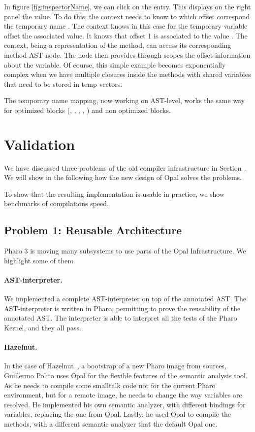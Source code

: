 \documentclass[preprint,10pt]{sigplanconf}
\begin{document}
In figure \ref{fig:inspectorName}, we can click on the \ct{[temp]} entry. This displays on the right panel the value. To do this, the context needs to know to which offset correspond the temporary name . The context knows in this case for the temporary variable offset the associated value. It knows that offset 1 is associated to the value . The context, being a representation of the method, can access its corresponding method AST node. The node then provides through scopes the offset information about the variable. Of course, this simple example becomes exponentially complex when we have multiple closures inside the methods with shared variables that need to be stored in temp vectors.

The temporary name mapping, now working on AST-level, works the same way for optimized blocks (, , , , ) and non optimized blocks.

\section{Validation}
\label{sec:validation}

We have discussed three problems of the old compiler infrastructure in Section~. We will show in the following how the new design of Opal solves
the problems.

To show that the resulting implementation is usable in practice, we show benchmarks of compilations speed.


\subsection{Problem 1: Reusable Architecture}
\label{sec:reusableArchitecture}

Pharo 3 is moving many subsystems to use parts of the Opal Infrastructure. We highlight some of them.

\paragraph{AST-interpreter.} We implemented a complete AST-interpreter on top of the annotated AST. The AST-interpreter is written in Pharo, permitting to prove the reusability of the annotated AST. The interpreter is able to interpret all the tests of the Pharo Kernel, and they all pass.

\paragraph{Hazelnut.} In the case of Hazelnut~\cite{Casa11a}, a bootstrap of a new Pharo image from sources, Guillermo Polito uses Opal for the flexible features of the semantic analysis tool. As he needs to compile some smalltalk code not for the current Pharo environment, but for a remote image, he needs to change the way variables are resolved. He implemented his own semantic analyzer, with different bindings for variables, replacing the one from Opal. Lastly, he used Opal to compile the methods, with a different semantic analyzer that the default Opal one.
\end{document}
